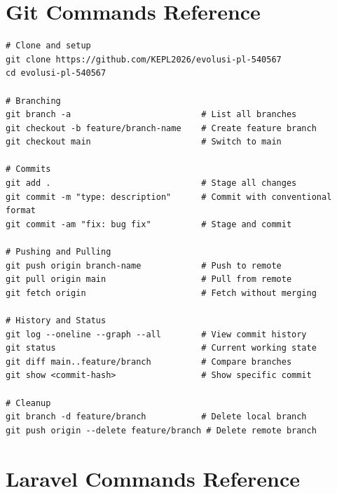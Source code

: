 \documentclass[a4paper,oneside,11pt]{book}
\begin{document}
\section{Git Commands Reference}

\begin{lstlisting}[style=phpStyle, caption={Essential Git Commands}, label={kode:gitcommands}]
# Clone and setup
git clone https://github.com/KEPL2026/evolusi-pl-540567
cd evolusi-pl-540567

# Branching
git branch -a                          # List all branches
git checkout -b feature/branch-name    # Create feature branch
git checkout main                      # Switch to main

# Commits
git add .                              # Stage all changes
git commit -m "type: description"      # Commit with conventional format
git commit -am "fix: bug fix"          # Stage and commit

# Pushing and Pulling
git push origin branch-name            # Push to remote
git pull origin main                   # Pull from remote
git fetch origin                       # Fetch without merging

# History and Status
git log --oneline --graph --all        # View commit history
git status                             # Current working state
git diff main..feature/branch          # Compare branches
git show <commit-hash>                 # Show specific commit

# Cleanup
git branch -d feature/branch           # Delete local branch
git push origin --delete feature/branch # Delete remote branch
\end{lstlisting}

\section{Laravel Commands Reference}
\end{document}
